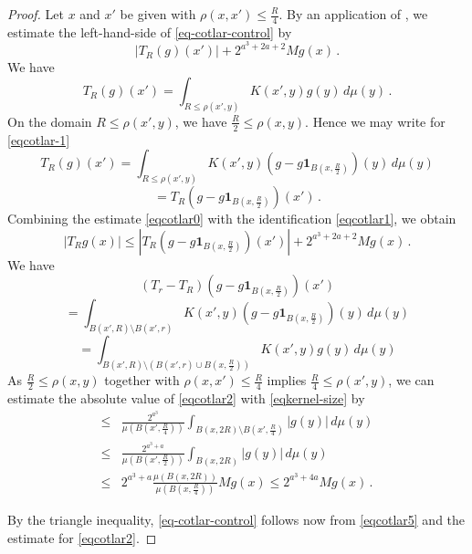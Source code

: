 \begin{proof}
\leanok
Let $x$ and $x'$ be given with $\rho(x,x')\le\frac {R}{4}$.
By an application of , we estimate
the left-hand-side of
\eqref{eq-cotlar-control} by
\begin{equation}\label{eqcotlar0}
|T_R(g)(x')|+
2^{a^3 + 2a + 2} Mg(x)\,.
\end{equation}
We  have
\begin{equation}
\label{eqcotlar-1}
T_R(g)(x')=
\int_{R\le\rho(x',y)} K(x',y) g(y) \, d\mu(y)\, .
\end{equation}
On the domain $R\le\rho(x',y)$, we have $\frac {R}2\le\rho(x,y)$. Hence we may write
for \eqref{eqcotlar-1}
\begin{equation*}
T_R(g)(x')=\int_{R\le\rho(x',y)} K(x',y) (g-g\mathbf{1}_{B(x,\frac {R} 2)})(y) \,d\mu(y)
\end{equation*}
\begin{equation}\label{eqcotlar1}
=T_R(g-g\mathbf{1}_{B(x,\frac {R} 2)})(x')\, .
\end{equation}
Combining the estimate \eqref{eqcotlar0} with the identification \eqref{eqcotlar1}, we obtain
\begin{equation}\label{eqcotlar5}
\left|T_R g(x)
\right|\le
|T_R(g-g\mathbf{1}_{B(x,\frac {R} 2)})(x')|+
2^{a^3 + 2a + 2} Mg(x)\, .
\end{equation}
We  have
\begin{equation*}
(T_r-T_R)(g-g\mathbf{1}_{B(x,\frac {R} 2)})(x')
\end{equation*}
\begin{equation*}
= \int_{B(x',R)\setminus B(x',r)} K(x',y) (g-g\mathbf{1}_{B(x,\frac {R} 2)})(y) \,d\mu(y)
\end{equation*}
\begin{equation}\label{eqcotlar2}
= \int_{B(x',R)\setminus (B(x',r) \cup B(x,\frac{R}{2}))} K(x',y) g(y) \,d\mu(y)
\end{equation}
As $\frac{R}{2}\le\rho(x,y)$ together with $\rho(x,x')\le\frac {R}{4}$ implies
$\frac {R}{4}\le\rho(x',y)$, we can estimate the absolute value of \eqref{eqcotlar2} with \eqref{eqkernel-size} by
\begin{align*}
\le &\frac{2^{a^3}}{\mu(B(x',\frac{R}{4}))} \int_{B(x,2R)\setminus B(x',\frac{R}{4})}
|g(y)|\, d\mu(y) \\
\le &\frac{2^{a^3+a}}{\mu(B(x',\frac{R}{2}))} \int_{B(x,2R)}
|g(y)|\, d\mu(y) \\
\le &2^{a^3+a} \frac{\mu(B(x,2R))}{\mu(B(x,\frac{R}{4}))} Mg(x) \le 2^{a^3 + 4a} Mg(x)\, .
\end{align*}

By the triangle inequality, \eqref{eq-cotlar-control} follows now from \eqref{eqcotlar5} and the estimate for \eqref{eqcotlar2}.
\end{proof}

